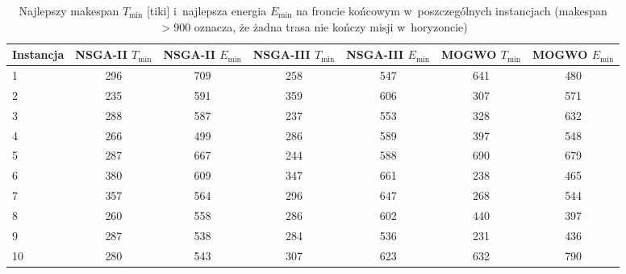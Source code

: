 \begin{table}[htbp]
    \centering
    \caption{Najlepszy makespan $T_{\min}$ [tiki] i~najlepsza energia $E_{\min}$ na froncie końcowym w~poszczególnych instancjach (makespan $> 900$ oznacza, że żadna trasa nie kończy misji w~horyzoncie)}
    \label{tab:per_run_objectives}
    \begin{tabular}{l c c c c c c}
        \hline
        Instancja & NSGA-II $T_{\min}$ & NSGA-II $E_{\min}$ & NSGA-III $T_{\min}$ & NSGA-III $E_{\min}$ & MOGWO $T_{\min}$ & MOGWO $E_{\min}$ \\
        \hline
        1 & 296 & 709 & 258 & 547 & 641 & 480 \\
        2 & 235 & 591 & 359 & 606 & 307 & 571 \\
        3 & 288 & 587 & 237 & 553 & 328 & 632 \\
        4 & 266 & 499 & 286 & 589 & 397 & 548 \\
        5 & 287 & 667 & 244 & 588 & 690 & 679 \\
        6 & 380 & 609 & 347 & 661 & 238 & 465 \\
        7 & 357 & 564 & 296 & 647 & 268 & 544 \\
        8 & 260 & 558 & 286 & 602 & 440 & 397 \\
        9 & 287 & 538 & 284 & 536 & 231 & 436 \\
        10 & 280 & 543 & 307 & 623 & 632 & 790 \\
        \hline
    \end{tabular}
\end{table}
